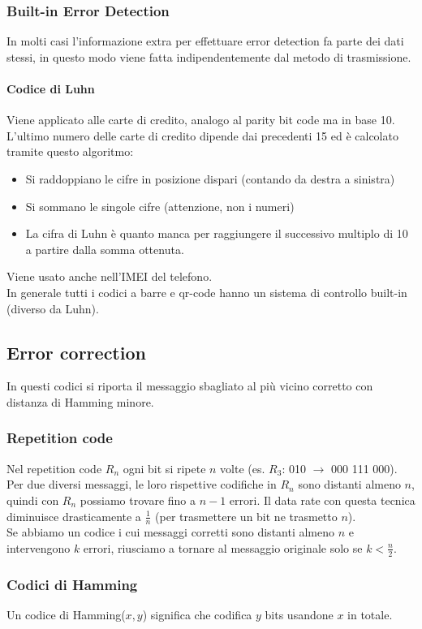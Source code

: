 \documentclass[10pt,a4paper,twoside]{article}
\begin{document}
\subsubsection{Built-in Error Detection}
In molti casi l'informazione extra per effettuare error detection fa parte dei dati stessi, in questo modo viene fatta indipendentemente dal metodo di trasmissione.
\paragraph{Codice di Luhn} Viene applicato alle carte di credito, analogo al parity bit code ma in base 10. L'ultimo numero delle carte di credito dipende dai precedenti 15 ed è calcolato tramite questo algoritmo:
\begin{itemize}
\item Si raddoppiano le cifre in posizione dispari (contando da destra a sinistra)
\item Si sommano le singole cifre (attenzione, non i numeri)
\item La cifra di Luhn è quanto manca per raggiungere il successivo multiplo di 10 a partire dalla somma ottenuta.
\end{itemize}
Viene usato anche nell'IMEI del telefono.\\
In generale tutti i codici a barre e qr-code hanno un sistema di controllo built-in (diverso da Luhn).

\subsection{Error correction}
In questi codici si riporta il messaggio sbagliato al più vicino corretto con distanza di Hamming minore.
\subsubsection{Repetition code}
Nel repetition code $R_n$ ogni bit si ripete $n$ volte (es. $R_3$: 010 $\rightarrow$ 000 111 000).\\
Per due diversi messaggi, le loro rispettive codifiche in $R_n$ sono distanti almeno $n$, quindi con $R_n$ possiamo trovare fino a $n-1$ errori. Il data rate con questa tecnica diminuisce drasticamente a $\frac{1}{n}$ (per trasmettere un bit ne trasmetto $n$).\\
Se abbiamo un codice i cui messaggi corretti sono distanti almeno $n$ e intervengono $k$ errori, riusciamo a tornare al messaggio originale solo se $k<\frac{n}{2}$.

\subsubsection{Codici di Hamming}
Un codice di Hamming($x,y$) significa che codifica $y$ bits usandone $x$ in totale.
\end{document}
